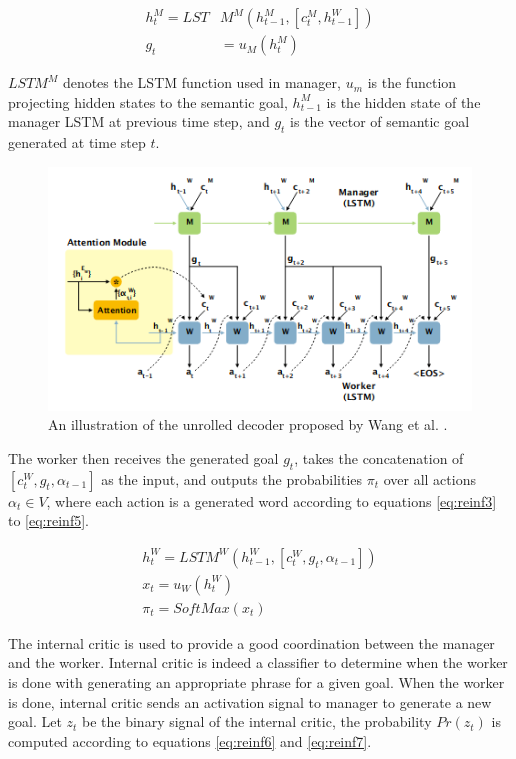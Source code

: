 \documentclass[preprint, 12pt]{elsarticle}
\begin{document}
		\begin{align}
			h_t^M = LST&M^M(h_{t-1}^M, [c_t^M, h_{t-1}^W]) \label{eq:reinf1} \\
			g_t &= u_M(h_t^M) \label{eq:reinf2}
		\end{align}
		
		$LSTM^M$ denotes the LSTM function used in manager, $u_m$ is the function projecting hidden states to the semantic goal, $h_{t-1}^M$ is the hidden state of the manager LSTM at previous time step, and $g_t$ is the vector of semantic goal generated at time step $t$.
		
		\begin{figure}[H]
		\centering
		\includegraphics[scale=0.7]{Imgs/reinf2.png}
		\caption{An illustration of the unrolled decoder proposed by Wang et al. \cite{wang2018video}.}
		\label{fig:reinf2}
	\end{figure}
	
		The worker then receives the generated goal $g_t$, takes the concatenation of $[c_t^W, g_t, \alpha_{t-1}]$ as the input, and outputs the probabilities $\pi_t$ over all actions $\alpha_t \in V$, where each action is a generated word according to equations \eqref{eq:reinf3} to \eqref{eq:reinf5}.
		
		\begin{align}
			h_t^W = LSTM^W(h_{t-1}^W, [c_t^W, g_t, \alpha_{t-1}]) \label{eq:reinf3} \\
			x_t = u_W(h_t^W) \label{eq:reinf4} \\
			\pi_t = SoftMax(x_t) \label{eq:reinf5} 
		\end{align}
		
		The internal critic is used to provide a good coordination between the manager and the worker. Internal critic is indeed a classifier to determine when the worker is done with generating an appropriate phrase for a given goal. When the worker is done, internal critic sends an activation signal to manager to generate a new goal. Let $z_t$ be the binary signal of the internal critic, the probability $Pr(z_t)$ is computed according to equations \eqref{eq:reinf6} and \eqref{eq:reinf7}.
		
\end{document}

